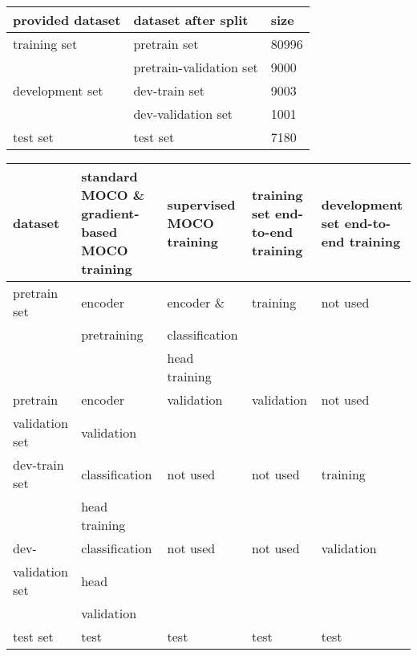 \documentclass[12pt,twoside]{report}
\begin{document}
\begin{table}[]
    \centering
    \begin{tabular}{|l|l|l|}
    \toprule
    provided dataset & dataset after split & size \\
    \hline
    training set & pretrain set & 80996\\
                 & pretrain-validation set & 9000 \\
    \hline
    development set & dev-train set & 9003 \\
                 & dev-validation set & 1001 \\
    \hline
    test set     & test set & 7180 \\
    \bottomrule
    \end{tabular}
    \captionsetup{type=table}
    \label{tab:dataset_scale}
\end{table}

\begin{table}[]
    \centering
    \begin{tabular}{|p{2.5cm}|p{2.6cm}|p{2.5cm}|p{2.1cm}|p{2.3cm}|}
    \toprule
    dataset & standard MOCO \& gradient-based MOCO training & supervised MOCO training & training set end-to-end training & development set end-to-end training\\
    \hline
    pretrain set   & encoder        & encoder \&     & training   & not used \\
                   & pretraining    & classification &            &          \\
                   &                & head training  &            &          \\
    \hline
    pretrain       & encoder        & validation     & validation & not used \\
    validation set & validation     &                &            &          \\
    \hline
    dev-train set  & classification & not used       & not used   & training \\
                   & head training  &                &            &          \\
    \hline
    dev-           & classification & not used       & not used   & validation \\
    validation set & head           &                &            &            \\
                   & validation     &                &            &            \\
    \hline
    test set & test & test & test & test \\
    
    \bottomrule
    \end{tabular}
    \captionsetup{type=table}
    \label{tab:dataset_usage}
\end{table}
\end{document}
